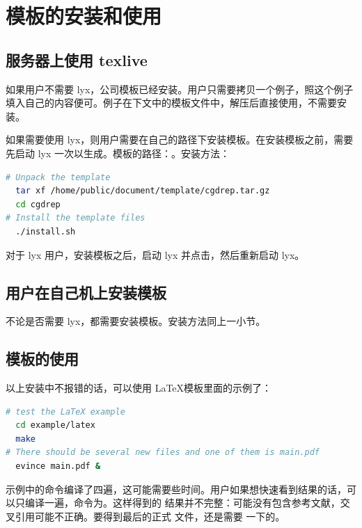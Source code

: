 \section{模板的安装和使用}
\subsection{服务器上使用 texlive}
如果用户不需要 lyx，公司模板已经安装。用户只需要拷贝一个例子，照这个例子填入自己的内容便可。例子在下文中的模板文件中，解压后直接使用，不需要安装。

如果需要使用 lyx，则用户需要在自己的路径下安装模板。在安装模板之前，需要先启动 lyx 一次以生成。模板的路径：。安装方法：
\begin{lstlisting}[language=sh,caption={安装模板}]
# Unpack the template
  tar xf /home/public/document/template/cgdrep.tar.gz
  cd cgdrep
# Install the template files
  ./install.sh
\end{lstlisting}

对于 lyx 用户，安装模板之后，启动 lyx 并点击，然后重新启动 lyx。

\subsection{用户在自己机上安装模板}
不论是否需要 lyx，都需要安装模板。安装方法同上一小节。

\subsection{模板的使用}
以上安装中不报错的话，可以使用 \LaTeX 模板里面的示例了：
\begin{lstlisting}[language=sh,caption={模板示例}]
# test the LaTeX example
  cd example/latex
  make
# There should be several new files and one of them is main.pdf
  evince main.pdf &
\end{lstlisting}

示例中的命令编译了四遍，这可能需要些时间。用户如果想快速看到结果的话，可以只编译一遍，命令为。这样得到的 结果并不完整：可能没有包含参考文献，交叉引用可能不正确。要得到最后的正式 文件，还是需要 一下的。

